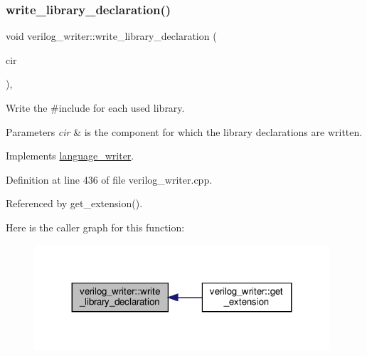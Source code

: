 \subsubsection{\texorpdfstring{write\+\_\+library\+\_\+declaration()}{write\_library\_declaration()}}
{\footnotesize\ttfamily void verilog\+\_\+writer\+::write\+\_\+library\+\_\+declaration (\begin{DoxyParamCaption}\item[{const \hyperlink{structural__objects_8hpp_a8ea5f8cc50ab8f4c31e2751074ff60b2}{structural\+\_\+object\+Ref} \&}]{cir }\end{DoxyParamCaption})\hspace{0.3cm}{\ttfamily [override]}, {\ttfamily [virtual]}}



Write the \#include for each used library. 


\begin{DoxyParams}{Parameters}
{\em cir} & is the component for which the library declarations are written. \\
\hline
\end{DoxyParams}


Implements \hyperlink{classlanguage__writer_ab43debc2245af8078bb36b157d780aca}{language\+\_\+writer}.



Definition at line 436 of file verilog\+\_\+writer.\+cpp.



Referenced by get\+\_\+extension().

Here is the caller graph for this function\+:
\nopagebreak
\begin{figure}[H]
\begin{center}
\leavevmode
\includegraphics[width=311pt]{d8/dba/classverilog__writer_a271c63e96fc1d6907503b0a0698ef6f8_icgraph}
\end{center}
\end{figure}
\mbox{\label{classverilog__writer_a1acf62504aefe5c48d6257cf707b59c3}} 

